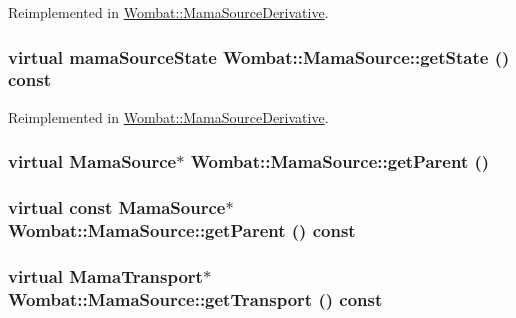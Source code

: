 Reimplemented in \hyperlink{classWombat_1_1MamaSourceDerivative_a2890de3e06726484076e528175accbbf}{Wombat::MamaSourceDerivative}.\hypertarget{classWombat_1_1MamaSource_a798167fdd8717dab1954b2329f8f612f}{
\subsubsection[{getState}]{\setlength{\rightskip}{0pt plus 5cm}virtual mamaSourceState Wombat::MamaSource::getState () const}}
\label{classWombat_1_1MamaSource_a798167fdd8717dab1954b2329f8f612f}


Reimplemented in \hyperlink{classWombat_1_1MamaSourceDerivative_a594b539ec60c664bde5478100b39147e}{Wombat::MamaSourceDerivative}.\hypertarget{classWombat_1_1MamaSource_afce8ee5fabfb0a92c0727cdc00cee0e2}{
\subsubsection[{getParent}]{\setlength{\rightskip}{0pt plus 5cm}virtual {\bf MamaSource}$\ast$ Wombat::MamaSource::getParent ()}}
\label{classWombat_1_1MamaSource_afce8ee5fabfb0a92c0727cdc00cee0e2}
\hypertarget{classWombat_1_1MamaSource_a38ff9e474d0a12bd86b161214bc5eeb0}{
\subsubsection[{getParent}]{\setlength{\rightskip}{0pt plus 5cm}virtual const {\bf MamaSource}$\ast$ Wombat::MamaSource::getParent () const}}
\label{classWombat_1_1MamaSource_a38ff9e474d0a12bd86b161214bc5eeb0}
\hypertarget{classWombat_1_1MamaSource_a6c7cba3c44c57cce76be998909eac57a}{
\subsubsection[{getTransport}]{\setlength{\rightskip}{0pt plus 5cm}virtual {\bf MamaTransport}$\ast$ Wombat::MamaSource::getTransport () const}}
